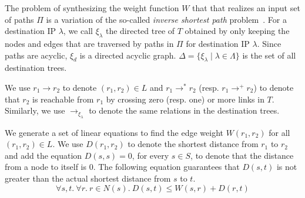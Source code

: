 The problem of synthesizing the weight function $W$ that
that realizes an input set of paths $\Pi$ is
a
variation of the so-called {\em inverse shortest path} 
problem~\cite{isp}. 
For a destination IP $\lambda$, we call $\xi_\lambda$ 
the directed tree of $T$ 
obtained by only keeping the nodes and edges 
that are traversed by paths in $\Pi$ for 
destination IP $\lambda$.
Since paths are acyclic, $\xi_d$ is a directed acyclic graph.
$\Delta=\{\xi_\lambda\mid \lambda \in \Lambda\}$ is   
the set of all destination trees. 

We use  $r_1\rightarrow r_2$ to denote $(r_1,r_2)\in L$ and
$r_1\rightarrow^* r_2$ (resp. $r_1\rightarrow^+ r_2$) to denote 
that $r_2$ is reachable from $r_1$ by crossing zero 
(resp. one) or more links in $T$.
Similarly, we use $\rightarrow_{\xi_\lambda}$ 
to denote the same relations in the destination trees.


We generate a set of linear equations
to find the edge weight $W(r_1, r_2)$ 
for all $(r_1, r_2) \in L$.
We use 
$D(r_1, r_2)$ to denote the 
shortest distance from $r_1$ to $r_2$ and
add the equation $D(s,s) = 0$, 
for every $s\in S$, to denote that the distance
from a node to itself is $0$.
The
following equation guarantees that $D(s,t)$ is not greater than 
the actual shortest distance from $s$ to $t$.
\begin{equation} \label{eq:dist}
\forall s, t. ~\forall r. ~r \in N(s).~
D(s, t) \leq W(s, r) + D(r, t)
\end{equation}

